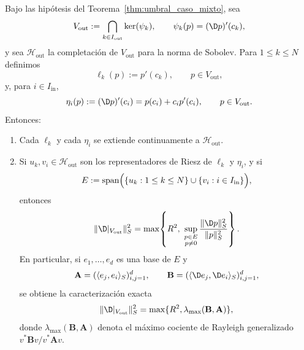 \begin{thm}
	\label{thm:caracterizacion_finita_vout_mixto}
	Bajo las hipótesis del Teorema~\ref{thm:umbral_caso_mixto}, sea
	\[
		V_{\mathrm{out}}:=\bigcap_{k\in I_{\mathrm{out}}}\ker(\psi_k),
		\qquad
		\psi_k(p)=(\D p)'(c_k),
	\]
	y sea $\mathcal H_{\mathrm{out}}$ la completación de $V_{\mathrm{out}}$ para la norma de Sobolev. Para $1\le k\le N$ definimos
	\[
		\ell_k(p):=p'(c_k),
		\qquad p\in V_{\mathrm{out}},
	\]
	y, para $i\in I_{\mathrm{in}}$,
	\[
		\eta_i(p):=(\D p)'(c_i)=p(c_i)+c_ip'(c_i),
		\qquad p\in V_{\mathrm{out}}.
	\]
	Entonces:
	\begin{enumerate}
		\item Cada $\ell_k$ y cada $\eta_i$ se extiende continuamente a $\mathcal H_{\mathrm{out}}$.
		\item Si $u_k, v_i\in \mathcal H_{\mathrm{out}}$ son los representadores de Riesz de $\ell_k$ y $\eta_i$, y si
		      \[
			      E:=\operatorname{span}\Bigl(\{u_k:1\le k\le N\}\cup\{v_i:i\in I_{\mathrm{in}}\}\Bigr),
		      \]
		      entonces
		      \[
			      \|\D|_{V_{\mathrm{out}}}\|_S^2
			      =
			      \max\!\left\{R^2,\ \sup_{\substack{p\in E\\p\neq0}}\frac{\|\D p\|_S^2}{\|p\|_S^2}\right\}.
		      \]
		      En particular, si $e_1,\dots,e_d$ es una base de $E$ y
		      \[
			      \mathbf A=(\langle e_j,e_i\rangle_S)_{i,j=1}^d,
			      \qquad
			      \mathbf B=(\langle \D e_j,\D e_i\rangle_S)_{i,j=1}^d,
		      \]
		      se obtiene la caracterización exacta
		      \[
			      \|\D|_{V_{\mathrm{out}}}\|_S^2
			      =
			      \max\{R^2,\lambda_{\max}(\mathbf B,\mathbf A)\},
		      \]
		      donde $\lambda_{\max}(\mathbf B,\mathbf A)$ denota el máximo cociente de Rayleigh generalizado $v^*\mathbf Bv/v^*\mathbf Av$.
	\end{enumerate}
\end{thm}

